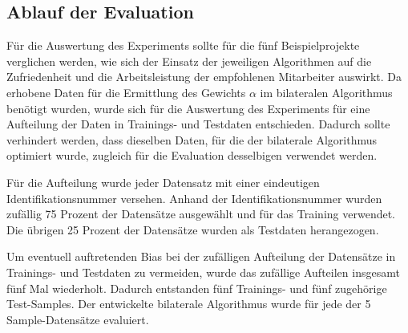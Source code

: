 




\subsection{Ablauf der Evaluation}
\label{ch:methodik:auswertung:ablauf}
Für die Auswertung des Experiments sollte für die fünf Beispielprojekte verglichen werden, wie sich der Einsatz der jeweiligen Algorithmen auf die Zufriedenheit und die Arbeitsleistung der empfohlenen Mitarbeiter auswirkt.
Da erhobene Daten für die Ermittlung des Gewichts $\alpha$ im bilateralen Algorithmus benötigt wurden, wurde sich für die Auswertung des Experiments für eine Aufteilung der Daten in Trainings- und Testdaten entschieden.
Dadurch sollte verhindert werden, dass dieselben Daten, für die der bilaterale Algorithmus optimiert wurde, zugleich für die Evaluation desselbigen verwendet werden.

Für die Aufteilung wurde jeder Datensatz mit einer eindeutigen Identifikationsnummer versehen.
Anhand der Identifikationsnummer wurden zufällig 75 Prozent der Datensätze ausgewählt und für das Training verwendet.
Die übrigen 25 Prozent der Datensätze wurden als Testdaten herangezogen.

Um eventuell auftretenden Bias bei der zufälligen Aufteilung der Datensätze in Trainings- und Testdaten zu vermeiden, wurde das zufällige Aufteilen insgesamt fünf Mal wiederholt.
Dadurch entstanden fünf Trainings- und fünf zugehörige Test-Samples.
Der entwickelte bilaterale Algorithmus wurde für jede der 5 Sample-Datensätze evaluiert.

